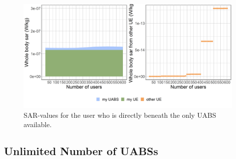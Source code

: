 \documentclass[twocolumn]{phdsymp} %
\begin{document}
\begin{figure}[h]
\centering
  \includegraphics[width=0.9\linewidth]{../results/s2/uvsulsarcentralUser.png}
  \caption{SAR-values for the user who is directly beneath the only \acs{UABS} available.}
  \label{fig:uvsulsarcentralUsers}
\end{figure}

\FloatBarrier
\subsection{Unlimited Number of UABSs}
\end{document}
